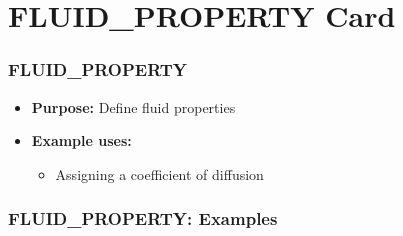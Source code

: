 \section{FLUID\_PROPERTY Card}

\begin{frame}\frametitle{FLUID\_PROPERTY}

\begin{itemize}
\item[] \textbf{Purpose:} Define fluid properties
\item[] \textbf{Example uses:}
\begin{itemize}
  \item Assigning a coefficient of diffusion
\end{itemize}
\end{itemize}

\end{frame}

\begin{frame}[fragile]\frametitle{FLUID\_PROPERTY: Examples}

\end{frame}

